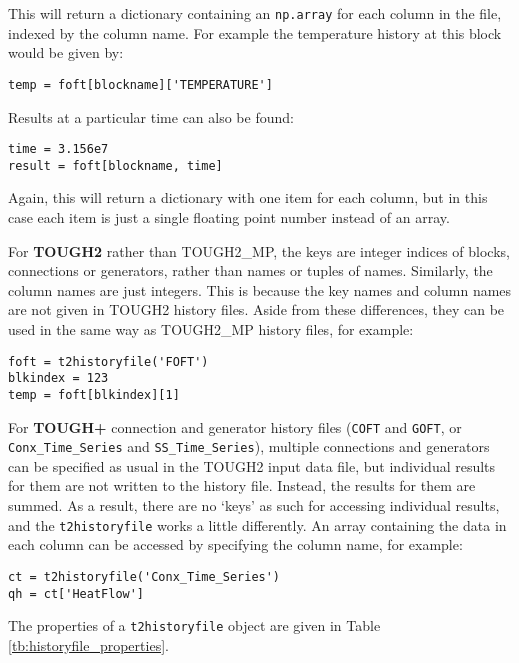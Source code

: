 This will return a dictionary containing an \texttt{np.array} for each column in the file, indexed by the column name.  For example the temperature history at this block would be given by:

\begin{lstlisting}
temp = foft[blockname]['TEMPERATURE']
\end{lstlisting}

Results at a particular time can also be found:

\begin{lstlisting}
time = 3.156e7
result = foft[blockname, time]
\end{lstlisting}

Again, this will return a dictionary with one item for each column, but in this case each item is just a single floating point number instead of an array.

For \textbf{TOUGH2} rather than TOUGH2\_MP, the keys are integer indices of blocks, connections or generators, rather than names or tuples of names.  Similarly, the column names are just integers.  This is because the key names and column names are not given in TOUGH2 history files.  Aside from these differences, they can be used in the same way as TOUGH2\_MP history files, for example:

\begin{lstlisting}
foft = t2historyfile('FOFT')
blkindex = 123
temp = foft[blkindex][1]
\end{lstlisting}

For \textbf{TOUGH+} connection and generator history files (\texttt{COFT} and \texttt{GOFT}, or \texttt{Conx\_Time\_Series} and \texttt{SS\_Time\_Series}), multiple connections and generators can be specified as usual in the TOUGH2 input data file, but individual results for them are not written to the history file.  Instead, the results for them are summed.  As a result, there are no `keys' as such for accessing individual results, and the \texttt{t2historyfile} works a little differently.  An array containing the data in each column can be accessed by specifying the column name, for example:

\begin{lstlisting}
ct = t2historyfile('Conx_Time_Series')
qh = ct['HeatFlow']
\end{lstlisting}

The properties of a \texttt{t2historyfile} object are given in Table \ref{tb:historyfile_properties}.

